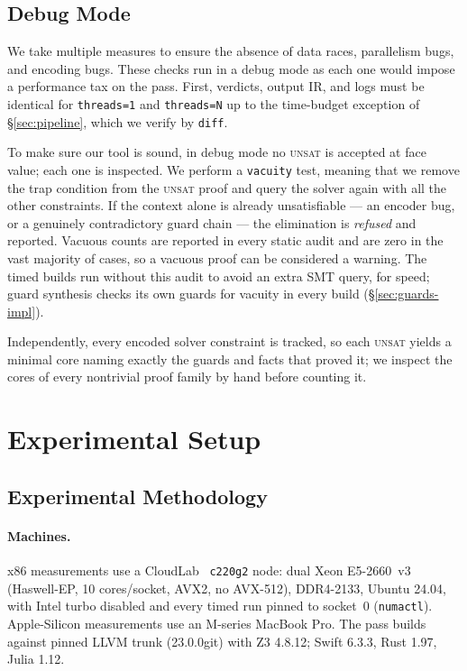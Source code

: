 \documentclass[acmsmall,screen,nonacm]{acmart}
\begin{document}
\subsection{Debug Mode}
\label{sec:audit}
We take multiple measures to ensure the absence of data races,
parallelism bugs, and encoding bugs. These checks run in a debug mode as each one would impose a performance tax on the pass. First,
verdicts, output IR, and logs must be identical for \texttt{threads=1}
and \texttt{threads=N} up to the time-budget exception of \S\ref{sec:pipeline}, which we verify by \texttt{diff}.

To make sure our tool is sound, in debug mode no
\textsc{unsat} is accepted at face value; each one is inspected. We perform a \texttt{vacuity} test, meaning that we remove the trap condition from the \textsc{unsat} proof and query the solver again with all the other constraints. If
the context alone is already unsatisfiable --- an encoder bug, or a
genuinely contradictory guard chain --- the elimination is
\emph{refused} and reported. Vacuous counts are reported in every static
audit and are zero in the vast majority of cases, so a vacuous proof can be
considered a warning. The timed builds run without this audit to avoid an extra SMT query, for speed; guard
synthesis checks its own guards for vacuity in every build
(\S\ref{sec:guards-impl}).

Independently, every encoded solver constraint is tracked, so each
\textsc{unsat} yields a minimal core naming exactly the guards and
facts that proved it; we inspect the cores of every nontrivial proof
family by hand before counting it.

\section{Experimental Setup}
\label{sec:results}
\subsection{Experimental Methodology}
\label{sec:method}
\paragraph{Machines.}
x86 measurements use a CloudLab~\cite{cloudlab} \texttt{c220g2} node:
dual Xeon E5-2660~v3 (Haswell-EP, 10 cores/socket, AVX2, no AVX-512),
DDR4-2133, Ubuntu 24.04, with Intel turbo disabled and every timed run
pinned to socket~0 (\texttt{numactl}). Apple-Silicon measurements use an
M-series MacBook Pro. The pass builds against pinned LLVM trunk
(23.0.0git) with Z3 4.8.12; Swift 6.3.3, Rust 1.97, Julia 1.12.
\end{document}
